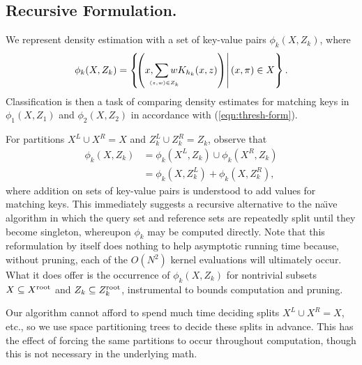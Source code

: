 \documentclass[twoside,leqno,twocolumn]{article}
\newcommand{\kdroot}[1]{#1^{\rm root}}
\newcommand{\kdleft}[1]{#1^{\!L}}
\newcommand{\kdright}[1]{#1^{\!R}}
\newcommand{\leftlim}[1]{\lefteqn{\scriptscriptstyle #1}}
\begin{document}
\subsection{Recursive Formulation.}
We represent density estimation with a set of key-value pairs
$\phi_k(X,Z_k)$, where
\begin{equation}
  \phi_k(X,Z_k) = \left\{ \!\! \left. \left( x, \sum_{\leftlim{(z,w) \in Z_k}} w K_{h_k}(x,z) \right) \right|
(x,\pi) \in X
  \right\} .
\end{equation}
Classification is then a task of comparing density estimates for
matching keys in $\phi_1(X,Z_1)$ and $\phi_2(X,Z_2)$ in accordance with
(\ref{eqn:thresh-form}).

For partitions $\kdleft{X} \cup \kdright{X} = X$ and $\kdleft{Z_k} \cup
\kdright{Z_k} = Z_k$, observe that
\begin{align}
  \label{eqn:q-split} \phi_k(X,Z_k) & = \phi_k(\kdleft{X},Z_k) \cup \phi_k(\kdright{X},Z_k) \\
  \label{eqn:r-split} & = \phi_k(X,\kdleft{Z_k}) + \phi_k(X,\kdright{Z_k}) ,
\end{align}
where addition on sets of key-value pairs is understood to add values
for matching keys.  This immediately suggests a recursive alternative
to the na\"{\i}ve algorithm in which the query set and reference sets
are repeatedly split until they become singleton, whereupon $\phi_k$
may be computed directly.  Note that this reformulation by itself does
nothing to help asymptotic running time because, without pruning, each
of the $O(N^2)$ kernel evaluations will ultimately occur.  What it
does offer is the occurrence of $\phi_k(X,Z_k)$ for nontrivial subsets
$X \subseteq \kdroot{X}$ and $Z_k \subseteq \kdroot{Z_k}$,
instrumental to bounds computation and pruning.

Our algorithm cannot afford to spend much time deciding splits
$\kdleft{X} \cup \kdright{X} = X$, etc., so we use space partitioning
trees to decide these splits in advance.  This has the effect of
forcing the same partitions to occur throughout computation, though
this is not necessary in the underlying math.
\end{document}
